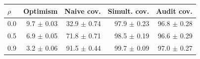 \begin{tabular}{lrrrr}
\toprule
$\rho$ & Optimism & Naive cov. & Simult. cov. & Audit cov. \\
\midrule
0.0 & 9.7 $\pm$ 0.03 & 32.9 $\pm$ 0.74 & 97.9 $\pm$ 0.23 & 96.8 $\pm$ 0.28 \\
0.5 & 6.9 $\pm$ 0.05 & 71.8 $\pm$ 0.71 & 98.5 $\pm$ 0.19 & 96.6 $\pm$ 0.29 \\
0.9 & 3.2 $\pm$ 0.06 & 91.5 $\pm$ 0.44 & 99.7 $\pm$ 0.09 & 97.0 $\pm$ 0.27 \\
\bottomrule
\end{tabular}
